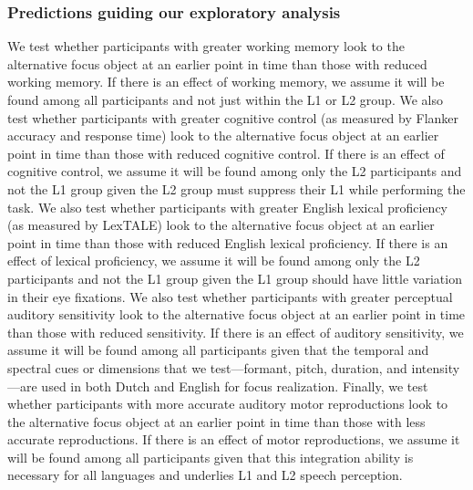 \subsubsection{Predictions guiding our exploratory analysis} 
We test whether participants with greater working memory look to the alternative focus object at an earlier point in time than those with reduced working memory. If there is an effect of working memory, we assume it will be found among all participants and not just within the L1 or L2 group. We also test whether participants with greater cognitive control (as measured by Flanker accuracy and response time) look to the alternative focus object at an earlier point in time than those with reduced cognitive control. If there is an effect of cognitive control, we assume it will be found among only the L2 participants and not the L1 group given the L2 group must suppress their L1 while performing the task. We also test whether participants with greater English lexical proficiency (as measured by LexTALE) look to the alternative focus object at an earlier point in time than those with reduced English lexical proficiency. If there is an effect of lexical proficiency, we assume it will be found among only the L2 participants and not the L1 group given the L1 group should have little variation in their eye fixations. We also test whether participants with greater perceptual auditory sensitivity look to the alternative focus object at an earlier point in time than those with reduced sensitivity. If there is an effect of auditory sensitivity, we assume it will be found among all participants given that the temporal and spectral cues or dimensions that we test---formant,
pitch, duration, and intensity---are used in both Dutch and English for focus realization. Finally, we test whether participants with more accurate auditory motor reproductions look to the alternative focus object at an earlier point in time than those with less accurate reproductions. If there is an effect of motor reproductions, we assume it will be found among all participants given that this integration ability is necessary for all languages and underlies L1 and L2 speech perception.
